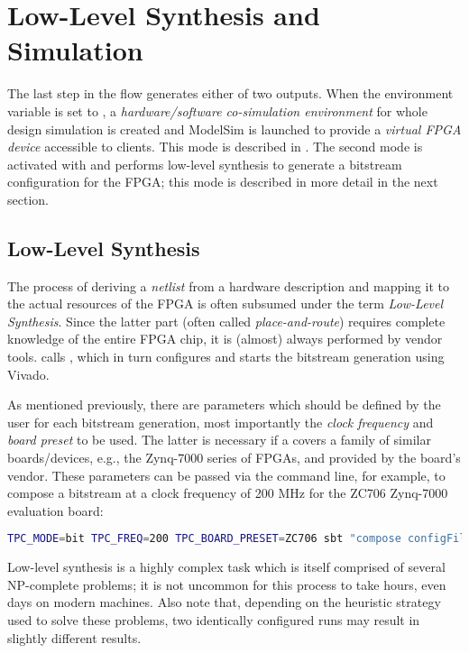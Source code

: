 \section{Low-Level Synthesis and Simulation}\label{sec:lls}%
The last step in the \tpc{} flow generates either of two outputs.
When the environment variable  is set to , a \emph{hardware/software co-simulation environment} for whole design simulation is created and ModelSim is launched to provide a \emph{virtual FPGA device} accessible to  clients.
This mode is described in .
The second mode is activated with  and performs low-level synthesis to generate a bitstream configuration for the FPGA; this mode is described in more detail in the next section.

\subsection*{Low-Level Synthesis}\label{sec:lls-lls}
The process of deriving a \emph{netlist} from a hardware description and mapping it to the actual resources of the FPGA is often subsumed under the term \emph{Low-Level Synthesis}.
Since the latter part (often called \emph{place-and-route}) requires complete knowledge of the entire FPGA chip, it is (almost) always performed by vendor tools.
\tpc{} calls , which in turn configures and starts the bitstream generation using Vivado.

\medskip
As mentioned previously, there are parameters which should be defined by the user for each bitstream generation, most importantly the \emph{clock frequency} and \emph{board preset} to be used.
The latter is necessary if a  covers a family of similar boards/devices, e.g., the Zynq-7000 series of FPGAs, and provided by the board's vendor.
These parameters can be passed via the command line, for example, to compose a bitstream at a clock frequency of 200 MHz for the ZC706 Zynq-7000 evaluation board:
%
\begin{lstlisting}[language=bash, morekeywords={TPC_FREQ, TPC_MODE, TPC_BOARD_PRESET}]
TPC_MODE=bit TPC_FREQ=200 TPC_BOARD_PRESET=ZC706 sbt "compose configFile ..."
\end{lstlisting}
%

\medskip
\begin{note}
Low-level synthesis is a highly complex task which is itself comprised of several NP-complete problems; it is not uncommon for this process to take hours, even days on modern machines.
Also note that, depending on the heuristic strategy used to solve these problems, two identically configured runs may result in slightly different results.
\end{note}

